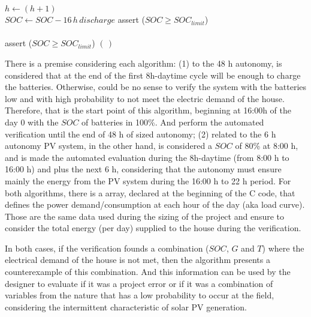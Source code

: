 \documentclass[journal]{IEEEtran}
\begin{document}
\begin{algorithm}
\begin{algorithmic}[1]
    \\
  \ENDIF
  \STATE $h \leftarrow (h+1)$
  \ENDFOR
  \\
  \STATE $SOC \leftarrow SOC - 16\,h\, discharge$  
  \STATE assert ($SOC \geq SOC_{limit}$)
  \\
  \\
  \STATE assert ($SOC \geq SOC_{limit}$)    
 \RETURN $(\,)$ 
 \end{algorithmic} 
 \end{algorithm}

There is a premise considering each algorithm: (1) to the 48 h autonomy, is considered that at the end of the first 8h-daytime cycle will be enough to charge the batteries. Otherwise, could be no sense to verify the system with the batteries low and with high probability to not meet the electric demand of the house. Therefore, that is the start point of this algorithm, beginning at 16:00h of the day 0 with the $SOC$ of batteries in 100\%. And perform the automated verification until the end of 48 h of sized autonomy; (2) related to the 6 h autonomy PV system, in the other hand, is considered a $SOC$ of 80\% at 8:00 h, and is made the automated evaluation during the 8h-daytime (from 8:00 h to 16:00 h) and plus the next 6 h, considering that the autonomy must ensure mainly the energy from the PV system during the 16:00 h to 22 h period. For both algorithms, there is a array, declared at the beginning of the C code, that defines the power demand/consumption at each hour of the day (aka load curve). Those are the same data used during the sizing of the project and ensure to consider the total energy (per day) supplied to the house during the verification. 

In both cases, if the  verification founds a combination ($SOC$, $G$ and $T$) where the electrical demand of the house is not met, then the algorithm presents a counterexample of this combination. And this information can be used by the designer to evaluate if it was a project error or if it was a combination of variables from the nature that has a low probability to occur at the field, considering the intermittent characteristic of solar PV generation.
\end{document}
